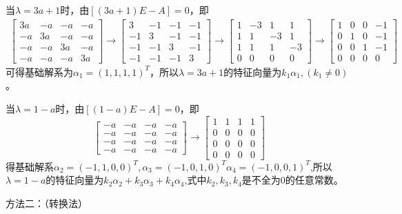 \documentclass[a4paper]{report}
\begin{document}
\begin{tips}
\begin{jie}
当$\lambda=3a+1$时，由$[(3a+1)E-A]=0$，即
\begin{align*}
\begin{bmatrix}
3a & -a& -a& -a \\
-a& 3a& -a& -a\\
-a& -a& 3a& -a\\
-a& -a& -a& 3a
\end{bmatrix}\rightarrow
\begin{bmatrix}
3 & -1& -1& -1 \\
-1& 3& -1& -1\\
-1& -1& 3& -1\\
-1& -1& -1& 3
\end{bmatrix}\rightarrow
\begin{bmatrix}
1 & -3& 1& 1 \\
1& 1& -3& 1\\
1& 1& 1& -3\\
0&0& 0& 0
\end{bmatrix}\rightarrow
\begin{bmatrix}
1 & 0& 0& -1 \\
0& 1& 0& -1\\
0& 0& 1& -1\\
0&0& 0& 0
\end{bmatrix}
\end{align*}
可得基础解系为$\alpha_{1}=(1,1,1,1)^T$，所以$\lambda=3a+1$的特征向量为$k_{1}\alpha_1,(k_1\neq 0)$。

当$\lambda=1-a$时，由$[(1-a)E-A]=0$，即
\begin{equation*}
  \begin{bmatrix}
-a & -a & -a& -a\\
-a & -a & -a& -a\\
-a & -a & -a& -a\\
-a & -a & -a& -a
  \end{bmatrix}\rightarrow
  \begin{bmatrix}
    1 & 1 & 1& 1\\
    0 & 0& 0& 0\\
    0 & 0& 0& 0\\
    0 & 0& 0& 0
  \end{bmatrix}
\end{equation*}
得基础解系$\alpha_2=(-1,1,0,0)^T,\alpha_3=(-1,0,1,0)^T\alpha_4=(-1,0,0,1)^T$,所以$\lambda=1-a$的特征向量为$k_2\alpha_2+k_3\alpha_3+k_4\alpha_4$,式中$k_2,k_3,k_4$是不全为0的任意常数。

方法二：（转换法）


\end{jie}
\end{tips}
\end{document}
